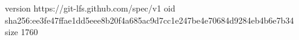 version https://git-lfs.github.com/spec/v1
oid sha256:ee3fe47ffae1dd5eee8b20f4a685ac9d7cc1e247be4e70684d9284eb4b6e7b34
size 1760
